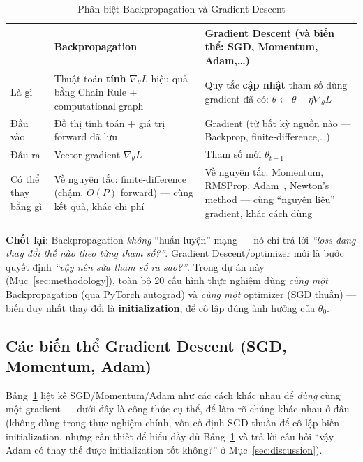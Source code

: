 \documentclass[12pt,a4paper]{article}
\begin{document}
\begin{table}[H]
\centering
\caption{Phân biệt Backpropagation và Gradient Descent}
\begin{tabular}{@{}p{2.6cm}p{5.7cm}p{6.3cm}@{}}
\toprule
 & \textbf{Backpropagation} & \textbf{Gradient Descent (và biến thể: SGD, Momentum, Adam,\ldots)} \\
\midrule
Là gì & Thuật toán \textbf{tính} $\nabla_\theta L$ hiệu quả bằng Chain Rule + computational graph & Quy tắc \textbf{cập nhật} tham số dùng gradient đã có: $\theta\leftarrow\theta-\eta\nabla_\theta L$ \\
Đầu vào & Đồ thị tính toán + giá trị forward đã lưu & Gradient (từ bất kỳ nguồn nào --- Backprop, finite-difference,\ldots) \\
Đầu ra & Vector gradient $\nabla_\theta L$ & Tham số mới $\theta_{t+1}$ \\
Có thể thay bằng gì & Về nguyên tắc: finite-difference (chậm, $O(P)$ forward) --- cùng kết quả, khác chi phí & Về nguyên tắc: Momentum, RMSProp, Adam~\citep{kingma2015adam}, Newton's method --- cùng ``nguyên liệu'' gradient, khác cách dùng \\
\bottomrule
\end{tabular}
\label{tab:bp_vs_gd}
\end{table}

\textbf{Chốt lại}: Backpropagation \emph{không} ``huấn luyện'' mạng --- nó
chỉ trả lời \emph{``loss đang thay đổi thế nào theo từng tham số?''}.
Gradient Descent/optimizer mới là bước quyết định \emph{``vậy nên sửa tham
số ra sao?''}. Trong dự án này (Mục~\ref{sec:methodology}), toàn bộ 20 cấu
hình thực nghiệm dùng \emph{cùng một} Backpropagation (qua PyTorch autograd)
và \emph{cùng một} optimizer (SGD thuần) --- biến duy nhất thay đổi là
\textbf{initialization}, để cô lập đúng ảnh hưởng của $\theta_0$.

\subsection{Các biến thể Gradient Descent (SGD, Momentum, Adam)}
\label{sec:optimizers}

Bảng~\ref{tab:bp_vs_gd} liệt kê SGD/Momentum/Adam như các cách khác nhau
để \emph{dùng} cùng một gradient --- dưới đây là công thức cụ thể, để làm
rõ chúng khác nhau ở đâu (không dùng trong thực nghiệm chính, vốn cố định
SGD thuần để cô lập biến initialization, nhưng cần thiết để hiểu đầy đủ
Bảng~\ref{tab:bp_vs_gd} và trả lời câu hỏi ``vậy Adam có thay thế được
initialization tốt không?'' ở Mục~\ref{sec:discussion}).
\end{document}
